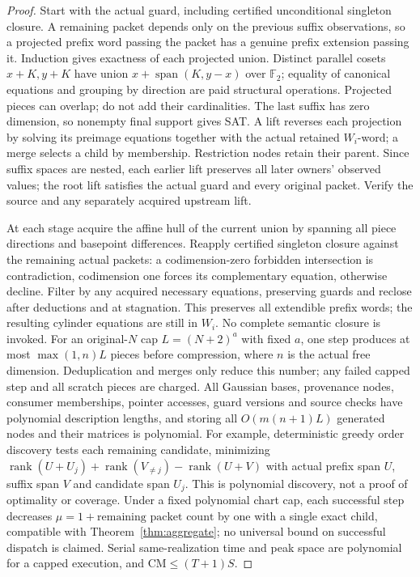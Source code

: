 \documentclass[11pt]{article}
\begin{document}
\begin{proof}
Start with the actual guard, including certified unconditional singleton closure. A remaining packet depends only on the previous suffix observations, so a projected prefix word passing the packet has a genuine prefix extension passing it. Induction gives exactness of each projected union. Distinct parallel cosets $x+K,y+K$ have union $x+\operatorname{span}(K,y-x)$ over $\mathbb F_2$; equality of canonical equations and grouping by direction are paid structural operations. Projected pieces can overlap; do not add their cardinalities. The last suffix has zero dimension, so nonempty final support gives SAT. A lift reverses each projection by solving its preimage equations together with the actual retained $W_i$-word; a merge selects a child by membership. Restriction nodes retain their parent. Since suffix spaces are nested, each earlier lift preserves all later owners' observed values; the root lift satisfies the actual guard and every original packet. Verify the source and any separately acquired upstream lift.

At each stage acquire the affine hull of the current union by spanning all piece directions and basepoint differences. Reapply certified singleton closure against the remaining actual packets: a codimension-zero forbidden intersection is contradiction, codimension one forces its complementary equation, otherwise decline. Filter by any acquired necessary equations, preserving guards and reclose after deductions and at stagnation. This preserves all extendible prefix words; the resulting cylinder equations are still in $W_i$. No complete semantic closure is invoked. For an original-$N$ cap $L=(N+2)^a$ with fixed $a$, one step produces at most $\max(1,n)L$ pieces before compression, where $n$ is the actual free dimension. Deduplication and merges only reduce this number; any failed capped step and all scratch pieces are charged. All Gaussian bases, provenance nodes, consumer memberships, pointer accesses, guard versions and source checks have polynomial description lengths, and storing all $O(m(n+1)L)$ generated nodes and their matrices is polynomial. For example, deterministic greedy order discovery tests each remaining candidate, minimizing $\operatorname{rank}(U+U_j)+\operatorname{rank}(V_{\ne j})-\operatorname{rank}(U+V)$ with actual prefix span $U$, suffix span $V$ and candidate span $U_j$. This is polynomial discovery, not a proof of optimality or coverage. Under a fixed polynomial chart cap, each successful step decreases $\mu=1+\text{remaining packet count}$ by one with a single exact child, compatible with Theorem~\ref{thm:aggregate}; no universal bound on successful dispatch is claimed. Serial same-realization time and peak space are polynomial for a capped execution, and $\mathrm{CM}\le(T+1)S$.
\end{proof}
\end{document}
